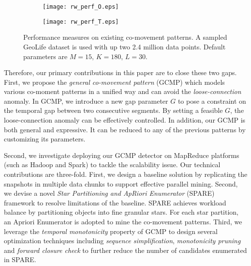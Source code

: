 \begin{figure}[h]
	\vspace{-3mm}
    \centering
    \begin{subfigure}[b]{0.23\textwidth}
            \centering
            \texttt{[image: rw\_perf\_O.eps]}
    \label{fig:fig1}
    \end{subfigure}
    \begin{subfigure}[b]{0.23\textwidth}
            \centering
            \texttt{[image: rw\_perf\_T.eps]}
    \label{fig:fig2}
    \end{subfigure}
    \vspace{-2mm}
    \caption{Performance measures on existing co-movement patterns. A sampled GeoLife dataset
    is used with up two 2.4 million data points. Default parameters are $M=15$, $K=180$, $L=30$.}
    \label{fig:related_work_scalability}
\end{figure}

Therefore, our primary contributions in this paper are to close these two gaps. 
First, we propose the \emph{general co-movement pattern} (GCMP) which models
various co-moment patterns in a unified way and can avoid 
the \emph{loose-connection} anomaly. In GCMP, we introduce a new gap parameter $G$ to pose a constraint on the temporal gap between two consecutive segments. 
By setting a feasible $G$, the loose-connection anomaly can be effectively controlled. In addition, our GCMP is both general and expressive. It can be reduced to any of the previous patterns by customizing its parameters.

Second, we investigate deploying our GCMP detector on MapReduce platforms (such as Hadoop and Spark) to tackle the scalability issue. Our technical contributions are three-fold. First, we design a baseline solution by replicating the snapshots in multiple data chunks to support effective parallel mining. Second, we devise a novel \emph{Star Partitioning and ApRiori Enumerator} (SPARE) framework to resolve limitations of the baseline. SPARE achieves workload balance by partitioning objects into fine granular stars.  For each star partition, an Apriori Enumerator is adopted to mine the co-movement patterns. Third, we leverage the \emph{temporal monotonicity} property of GCMP 
to design several optimization techniques including \emph{sequence simplification}, \emph{monotonicity pruning} and \emph{forward closure check} to further reduce the number of candidates enumerated in SPARE.

